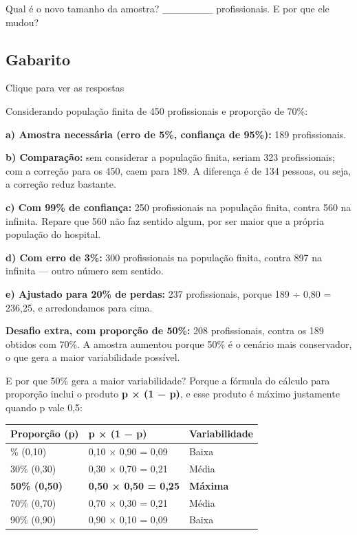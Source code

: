 \documentclass[
]{book}
\newcounter{none} %
\begin{document}
Qual é o novo tamanho da amostra? \_\_\_\_\_\_\_ profissionais. E por que ele mudou?

\subsection{Gabarito}\label{gabarito}

Clique para ver as respostas

Considerando população finita de 450 profissionais e proporção de 70\%:

\textbf{a) Amostra necessária (erro de 5\%, confiança de 95\%):} 189 profissionais.

\textbf{b) Comparação:} sem considerar a população finita, seriam 323 profissionais; com a correção para os 450, caem para 189. A diferença é de 134 pessoas, ou seja, a correção reduz bastante.

\textbf{c) Com 99\% de confiança:} 250 profissionais na população finita, contra 560 na infinita. Repare que 560 não faz sentido algum, por ser maior que a própria população do hospital.

\textbf{d) Com erro de 3\%:} 300 profissionais na população finita, contra 897 na infinita --- outro número sem sentido.

\textbf{e) Ajustado para 20\% de perdas:} 237 profissionais, porque 189 ÷ 0,80 = 236,25, e arredondamos para cima.

\textbf{Desafio extra, com proporção de 50\%:} 208 profissionais, contra os 189 obtidos com 70\%. A amostra aumentou porque 50\% é o cenário mais conservador, o que gera a maior variabilidade possível.

E por que 50\% gera a maior variabilidade? Porque a fórmula do cálculo para proporção inclui o produto \textbf{p × (1 − p)}, e esse produto é máximo justamente quando p vale 0,5:

{\def\LTcaptype{none} %
\begin{longtable}[]{@{}lll@{}}
\toprule\noalign{}
Proporção (p) & p × (1 − p) & Variabilidade \\
\midrule\noalign{}
\endhead
\bottomrule\noalign{}
\endlastfoot
10\% (0,10) & 0,10 × 0,90 = 0,09 & Baixa \\
30\% (0,30) & 0,30 × 0,70 = 0,21 & Média \\
\textbf{50\% (0,50)} & \textbf{0,50 × 0,50 = 0,25} & \textbf{Máxima} \\
70\% (0,70) & 0,70 × 0,30 = 0,21 & Média \\
90\% (0,90) & 0,90 × 0,10 = 0,09 & Baixa \\
\end{longtable}
}
\end{document}
